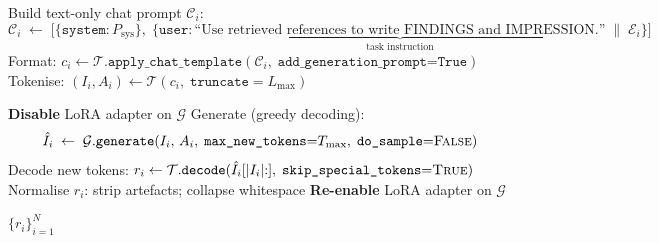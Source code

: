 \documentclass[12pt]{article}
\begin{document}
\begin{algorithm}[H]
\begin{algorithmic}[1]
    \State Build text-only chat prompt $\mathcal{C}_i$:
    \[
        \mathcal{C}_i \;\gets\;
        \bigl[\{\texttt{system}: P_{\text{sys}}\},\;
              \{\texttt{user}: \underbrace{\text{``Use retrieved references to write FINDINGS and IMPRESSION.''}}_{\text{task instruction}} \;\|\; \mathcal{E}_i\}\bigr]
    \]
    \State Format: $c_i \gets \mathcal{T}.\texttt{apply\_chat\_template}(\mathcal{C}_i,\;
           \texttt{add\_generation\_prompt=True})$
    \State Tokenise: $(I_i, A_i) \gets \mathcal{T}(c_i,\;\texttt{truncate}=L_{\max})$

    \State \textbf{Disable} LoRA adapter on $\mathcal{G}$ 
    \State Generate (greedy decoding):
    \[
        \hat{I}_i \;\gets\; \mathcal{G}.\texttt{generate}(I_i,\,A_i,\;
        \texttt{max\_new\_tokens}{=}T_{\max},\;
        \texttt{do\_sample}{=}\textsc{False})
    \]
    \State Decode new tokens: $r_i \gets \mathcal{T}.\texttt{decode}(\hat{I}_i[|I_i|{:}],\;
           \texttt{skip\_special\_tokens}{=}\textsc{True})$
    \State Normalise $r_i$: strip artefacts; collapse whitespace
    \State \textbf{Re-enable} LoRA adapter on $\mathcal{G}$ 

\EndFor

\State \Return $\{r_i\}_{i=1}^{N}$

\end{algorithmic}
\end{algorithm}
\end{document}
